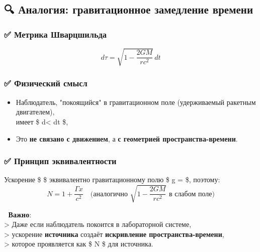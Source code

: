\documentclass[11pt]{article}
\providecommand{\tightlist}{%
      \setlength{\itemsep}{0pt}\setlength{\parskip}{0pt}}
\begin{document}
\subsection{🔍 Аналогия: гравитационное замедление
времени}\label{ux430ux43dux430ux43bux43eux433ux438ux44f-ux433ux440ux430ux432ux438ux442ux430ux446ux438ux43eux43dux43dux43eux435-ux437ux430ux43cux435ux434ux43bux435ux43dux438ux435-ux432ux440ux435ux43cux435ux43dux438}

\subsubsection{✅ Метрика
Шварцшильда}\label{ux43cux435ux442ux440ux438ux43aux430-ux448ux432ux430ux440ux446ux448ux438ux43bux44cux434ux430}

\[
d\tau = \sqrt{1 - \frac{2GM}{rc^2}} \, dt
\]

\subsubsection{✅ Физический
смысл}\label{ux444ux438ux437ux438ux447ux435ux441ux43aux438ux439-ux441ux43cux44bux441ux43b-1}

\begin{itemize}
\tightlist
\item
  Наблюдатель, "покоящийся" в гравитационном поле (удерживаемый ракетным
  двигателем),\\
  имеет \$ d\tau \textless{} dt \$,
\item
  Это \textbf{не связано с движением}, а \textbf{с геометрией
  пространства-времени}.
\end{itemize}

\subsubsection{✅ Принцип
эквивалентности}\label{ux43fux440ux438ux43dux446ux438ux43f-ux44dux43aux432ux438ux432ux430ux43bux435ux43dux442ux43dux43eux441ux442ux438}

Ускорение \$ \Gamma \$ эквивалентно гравитационному полю \$ g =
\Gamma \$, поэтому: \[
N = 1 + \frac{\Gamma x}{c^2} \quad \text{(аналогично } \sqrt{1 - \frac{2GM}{rc^2}} \text{ в слабом поле)}
\]

📌 \textbf{Важно}:\\
\textgreater{} Даже если наблюдатель покоится в лабораторной системе,\\
\textgreater{} ускорение \textbf{источника} создаёт \textbf{искривление
пространства-времени},\\
\textgreater{} которое проявляется как \$ N  \$ для источника.
\end{document}
